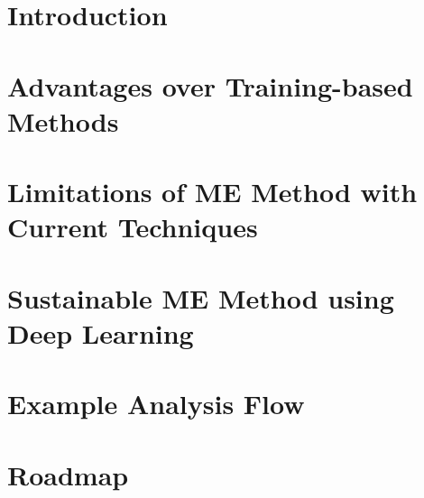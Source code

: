 \documentclass{article}
\begin{document}
\maketitle


\section{Introduction}
\label{sec:introduction}


\section{Advantages over Training-based Methods}
\label{sec:advantages}


\section{Limitations of ME Method with Current Techniques}
\label{sec:limitations}


\section{Sustainable ME Method using Deep Learning}
\label{sec:DNN}


\section{Example Analysis Flow}
\label{sec:Flow}


\section{Roadmap}
\label{sec:roadmap}



\printbibliography[title={References}]
\end{document}
